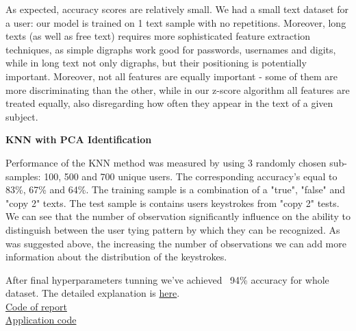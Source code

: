 \documentclass[12pt,a4]{article}
\begin{document}
As expected, accuracy scores are relatively small. We had a small text dataset for a user: our model is trained on 1 text sample with no repetitions. Moreover, long texts (as well as free text) requires more sophisticated feature extraction techniques, as simple digraphs work good for passwords, usernames and digits, while in long text not only digraphs, but their positioning is potentially important. Moreover, not all features are equally important - some of them are more discriminating than the other, while in our z-score algorithm all features are treated equally, also disregarding how often they appear in the text of a given subject.


\medskip
\small\textbf{KNN with PCA Identification}
\medskip

\normalsize

Performance of the KNN method was measured by using 3 randomly chosen sub-samples: 100, 500 and 700 unique users. The corresponding accuracy's equal to 83\%, 67\% and 64\%. The training sample is a combination of a "true", "false" and "copy 2" texts. The test sample is contains users keystrokes from "copy 2" tests. We can see that the number of observation significantly influence on the ability to distinguish between the user tying pattern by which they can be recognized. As was suggested above, the increasing the number of observations we can add more information about the distribution of the keystrokes.

After final hyperparameters tunning we've achieved ~94\% accuracy for whole dataset. The detailed explanation is  \href{https://github.com/vbyno/keystroke_dynamics/blob/master/hyperparameters_tunning.ipynb}{here}.
\\
\href{https://github.com/vbyno/keystroke_dynamics}{Code of report}
\\
\href{https://github.com/vbyno/keystroke_dynamics_app}{Application code}

{}

\end{document}
